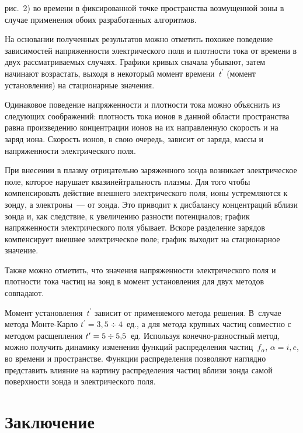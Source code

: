 \begin{multicols}{2}

\noindent
 рис.~2) во времени в фиксированной точке пространства 
возмущенной зоны в случае применения обоих разработанных алгоритмов.


На основании полученных результатов можно отметить похожее поведение зависимостей 
напряженности электрического поля и плотности тока от времени в двух рассматриваемых случаях. 
Графики кривых сначала убывают, затем начинают возрастать, выходя в некоторый момент 
времени~$t^\prime$ (момент установления) на стационарные значения. 

Одинаковое поведение 
напряженности и плот\-ности тока можно объяснить из следующих соображений: плотность тока ионов в 
данной области пространства равна произведению концентрации ионов на их направленную скорость и 
на заряд иона. Скорость ионов, в свою очередь, зависит от заряда, массы и напряженности 
электрического поля. 

При внесении в плазму отрицательно заряженного зонда возникает электрическое поле, которое 
нарушает квазинейтральность плазмы. Для того чтобы компенсировать действие внешнего 
электрического поля, ионы устремляются к зонду, а электроны~--- от зонда. Это приводит к дисбалансу 
концентраций вблизи зонда и, как следствие, к увеличению разности потенциалов; график 
напряженности электрического поля убывает. Вскоре разделение зарядов компенсирует внешнее 
электрическое поле; график выходит на стационарное значение. 

Также можно отметить, что значения 
напряженности электрического поля и плотности тока частиц на зонд в момент установления для двух 
методов совпадают. 

Момент установления~$t^\prime$ зависит от при\-ме\-ня\-емо\-го метода решения. В~случае метода 
Мон\-те-Кар\-ло $t^\prime=3{,}5\div 4$~ед., а для метода крупных частиц совместно с методом 
расщепления $t^\prime\hm=5\div 5{,}5$~ед. Используя ко\-неч\-но-раз\-ност\-ный метод, можно 
получить динамику изменения функций распределения частиц~$f_\alpha$, $\alpha=i,e$, во времени и 
пространстве. Функции распределения позволяют наглядно представить влияние на картину 
распределения частиц вблизи зонда самой поверхности зонда и электрического поля.

\section{Заключение}
      

\end{multicols}
